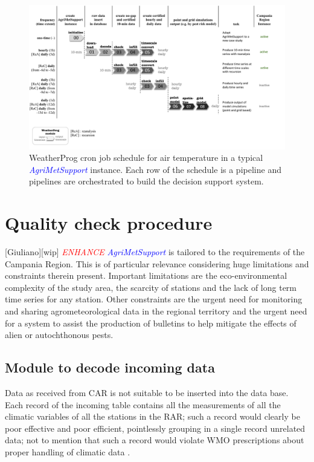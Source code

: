 \documentclass[authoryear,preprint,review,12pt]{elsarticle}
\newcommand{\note}[1]{\emph{\textcolor{red}{#1}}}
\newcommand{\update}[1]{\emph{\textcolor{blue}{#1}}}
\newcommand{\gci}{\update{AgriMetSupport}\xspace}
\begin{document}
\begin{figure}
	\centering
	\includegraphics[scale=.4]{figures/WeatherProg-schedule-fig.pdf}
	\caption{WeatherProg cron job schedule for air temperature in a typical \gci instance. Each row of the schedule is a pipeline and pipelines are orchestrated to build the decision support system.}
	\label{Fig:weatherprog:calls}
\end{figure}


\section{Quality check procedure}[Giuliano][wip] \label{sec:qcheck}
\note{ENHANCE}
\gci is tailored to the requirements of the Campania Region.
This is of particular relevance considering huge limitations and constraints therein present.
Important limitations are the eco-environmental complexity of the study area, the scarcity of stations and the lack of long term time series for any station.
Other constraints are the urgent need for monitoring and sharing agrometeorological data in the regional territory %
and the urgent need for a system to assist the production of bulletins to help mitigate the effects of alien or autochthonous pests.
 
 \subsection{Module to decode incoming data} Data as received from CAR is not suitable to be inserted into the data base. Each record of the incoming table contains all the measurements of all the climatic variables of all the stations in the RAR; such a record would clearly be poor effective and poor efficient, pointlessly grouping in a single record unrelated data; not to mention that such a record would violate WMO prescriptions about proper handling of climatic data \citep{wcdmp:cdms}.
 
\end{document}
